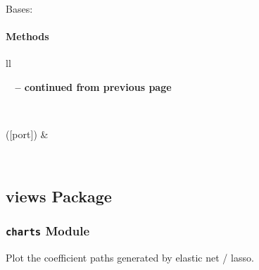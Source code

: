 \documentclass[letterpaper,10pt,english]{sphinxmanual}
\begin{document}
\begin{fulllineitems}
\label{qikify.recipes:qikify.recipes.two_tier_test.TwoTierTest}
Bases: 
\paragraph{Methods}

\begin{longtable}{ll}
\hline
\endfirsthead

%
{{\bfseries \tablename\ \thetable{} -- continued from previous page}} \\
\hline
\endhead

\hline {} \\ \hline
\endfoot

\hline
\endlastfoot


{\hyperref[qikify.recipes:qikify.recipes.two_tier_test.TwoTierTest.run]{}}({[}port{]})
 & 

\\\hline
\end{longtable}


\begin{fulllineitems}
\label{qikify.recipes:qikify.recipes.two_tier_test.TwoTierTest.run}
\end{fulllineitems}


\end{fulllineitems}



\subsection{views Package}
\label{qikify.views:views-package}\label{qikify.views::doc}

\subsubsection{\texttt{charts} Module}
\label{qikify.views:charts-module}\label{qikify.views:module-qikify.views.charts}

\begin{fulllineitems}
\label{qikify.views:qikify.views.charts.coef_path}
Plot the coefficient paths generated by elastic net / lasso.

\end{fulllineitems}
\end{document}
